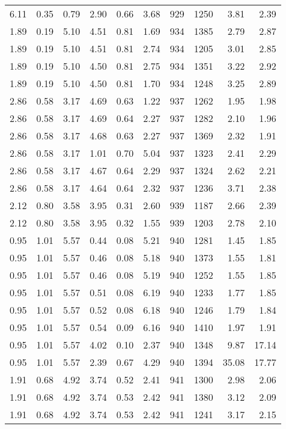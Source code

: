 \begin{longtable}{rrrrrrrrrr}
6.11	&	0.35	&	0.79	&	2.90	&	0.66	&	3.68	&	929	&	1250	&	3.81	&	2.39	\\
1.89	&	0.19	&	5.10	&	4.51	&	0.81	&	1.69	&	934	&	1385	&	2.79	&	2.87	\\
1.89	&	0.19	&	5.10	&	4.51	&	0.81	&	2.74	&	934	&	1205	&	3.01	&	2.85	\\
1.89	&	0.19	&	5.10	&	4.50	&	0.81	&	2.75	&	934	&	1351	&	3.22	&	2.92	\\
1.89	&	0.19	&	5.10	&	4.50	&	0.81	&	1.70	&	934	&	1248	&	3.25	&	2.89	\\
2.86	&	0.58	&	3.17	&	4.69	&	0.63	&	1.22	&	937	&	1262	&	1.95	&	1.98	\\
2.86	&	0.58	&	3.17	&	4.69	&	0.64	&	2.27	&	937	&	1282	&	2.10	&	1.96	\\
2.86	&	0.58	&	3.17	&	4.68	&	0.63	&	2.27	&	937	&	1369	&	2.32	&	1.91	\\
2.86	&	0.58	&	3.17	&	1.01	&	0.70	&	5.04	&	937	&	1323	&	2.41	&	2.29	\\
2.86	&	0.58	&	3.17	&	4.67	&	0.64	&	2.29	&	937	&	1324	&	2.62	&	2.21	\\
2.86	&	0.58	&	3.17	&	4.64	&	0.64	&	2.32	&	937	&	1236	&	3.71	&	2.38	\\
2.12	&	0.80	&	3.58	&	3.95	&	0.31	&	2.60	&	939	&	1187	&	2.66	&	2.39	\\
2.12	&	0.80	&	3.58	&	3.95	&	0.32	&	1.55	&	939	&	1203	&	2.78	&	2.10	\\
0.95	&	1.01	&	5.57	&	0.44	&	0.08	&	5.21	&	940	&	1281	&	1.45	&	1.85	\\
0.95	&	1.01	&	5.57	&	0.46	&	0.08	&	5.18	&	940	&	1373	&	1.55	&	1.81	\\
0.95	&	1.01	&	5.57	&	0.46	&	0.08	&	5.19	&	940	&	1252	&	1.55	&	1.85	\\
0.95	&	1.01	&	5.57	&	0.51	&	0.08	&	6.19	&	940	&	1233	&	1.77	&	1.85	\\
0.95	&	1.01	&	5.57	&	0.52	&	0.08	&	6.18	&	940	&	1246	&	1.79	&	1.84	\\
0.95	&	1.01	&	5.57	&	0.54	&	0.09	&	6.16	&	940	&	1410	&	1.97	&	1.91	\\
0.95	&	1.01	&	5.57	&	4.02	&	0.10	&	2.37	&	940	&	1348	&	9.87	&	17.14	\\
0.95	&	1.01	&	5.57	&	2.39	&	0.67	&	4.29	&	940	&	1394	&	35.08	&	17.77	\\
1.91	&	0.68	&	4.92	&	3.74	&	0.52	&	2.41	&	941	&	1300	&	2.98	&	2.06	\\
1.91	&	0.68	&	4.92	&	3.74	&	0.53	&	2.42	&	941	&	1380	&	3.12	&	2.09	\\
1.91	&	0.68	&	4.92	&	3.74	&	0.53	&	2.42	&	941	&	1241	&	3.17	&	2.15	\\

\end{longtable}
